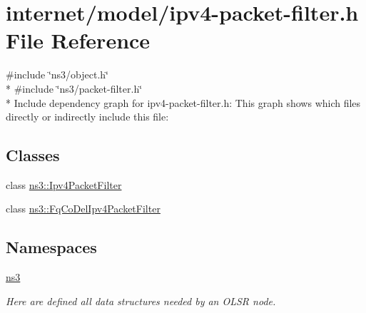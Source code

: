 \hypertarget{ipv4-packet-filter_8h}{}\section{internet/model/ipv4-\/packet-\/filter.h File Reference}
\label{ipv4-packet-filter_8h}
{\ttfamily \#include \char`\"{}ns3/object.\+h\char`\"{}}\\*
{\ttfamily \#include \char`\"{}ns3/packet-\/filter.\+h\char`\"{}}\\*
Include dependency graph for ipv4-\/packet-\/filter.h\+:
This graph shows which files directly or indirectly include this file\+:
\subsection*{Classes}
\begin{DoxyCompactItemize}
\item 
class \hyperlink{classns3_1_1Ipv4PacketFilter}{ns3\+::\+Ipv4\+Packet\+Filter}
\item 
class \hyperlink{classns3_1_1FqCoDelIpv4PacketFilter}{ns3\+::\+Fq\+Co\+Del\+Ipv4\+Packet\+Filter}
\end{DoxyCompactItemize}
\subsection*{Namespaces}
\begin{DoxyCompactItemize}
\item 
 \hyperlink{namespacens3}{ns3}
\begin{DoxyCompactList}\small\item\em Here are defined all data structures needed by an O\+L\+SR node. \end{DoxyCompactList}\end{DoxyCompactItemize}

